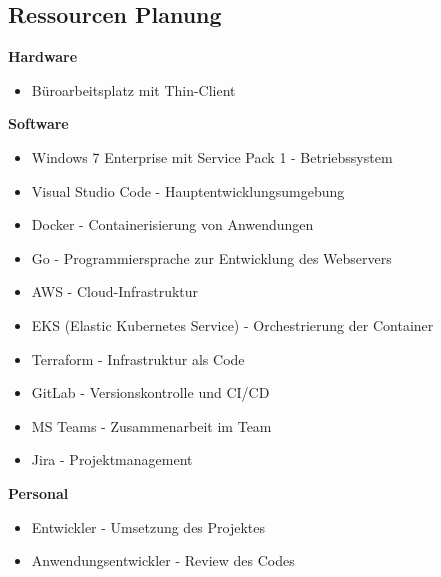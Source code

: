 \subsection{Ressourcen Planung}
\label{app:Ressourcen}
\textbf{Hardware}
\begin{itemize}
    \item Büroarbeitsplatz mit Thin-Client
\end{itemize}

\textbf{Software}
\begin{itemize}
    \item Windows 7 Enterprise mit Service Pack 1 - Betriebssystem
    \item Visual Studio Code - Hauptentwicklungsumgebung
    \item Docker - Containerisierung von Anwendungen
    \item Go - Programmiersprache zur Entwicklung des Webservers
    \item AWS - Cloud-Infrastruktur
    \item EKS (Elastic Kubernetes Service) - Orchestrierung der Container
    \item Terraform - Infrastruktur als Code
    \item GitLab - Versionskontrolle und CI/CD
    \item MS Teams - Zusammenarbeit im Team
    \item Jira - Projektmanagement
\end{itemize}

\textbf{Personal}
\begin{itemize}
    \item Entwickler - Umsetzung des Projektes
    \item Anwendungsentwickler - Review des Codes
\end{itemize}
